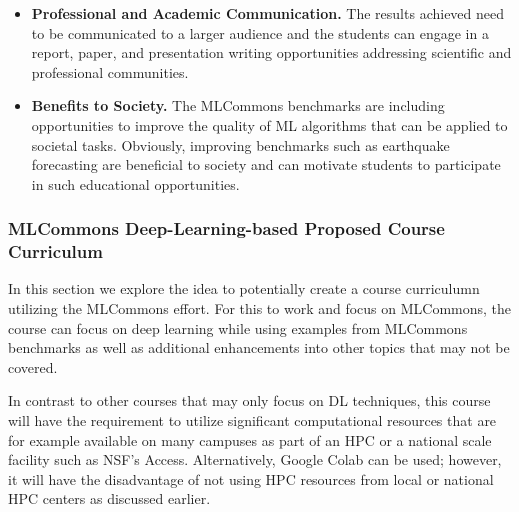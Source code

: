 \documentclass[utf8]{FrontiersinVancouver} %
\begin{document}
\begin{itemize}
\item {\bf Professional and Academic Communication.} The results achieved need to be communicated to a larger audience and the students can engage in a report, paper, and presentation writing opportunities addressing scientific and professional communities.

\item {\bf Benefits to Society.} The MLCommons benchmarks are including opportunities to improve the quality of ML algorithms that can be applied to societal tasks. Obviously, improving benchmarks such as earthquake forecasting are beneficial to society and can motivate students to participate in such educational opportunities.

\end{itemize}


\subsubsection{MLCommons Deep-Learning-based Proposed Course Curriculum}

In this section we explore the idea to potentially create a course curriculumn 
utilizing the MLCommons effort. For this to work and focus on MLCommons, the course can focus on deep learning while using examples from MLCommons benchmarks as well as additional enhancements into other topics that may not be covered.

In contrast to other courses that may only focus on DL techniques, this course will have the requirement to utilize significant computational resources that are for example available on many campuses as part of an HPC or a national scale facility such as NSF's Access. Alternatively, Google Colab can be used; however, it will have the disadvantage of not using HPC resources from local or national HPC centers as discussed earlier.
\end{document}
